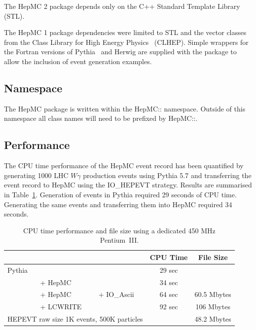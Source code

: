 \documentclass[11pt,letterpaper]{article}
\begin{document}
The HepMC 2 package  depends only on the C++ Standard
Template Library~\cite{stl} (STL).

The HepMC 1 package dependencies were limited to STL 
and the vector classes from the
Class Library for High Energy Physics~\cite{clhep} (CLHEP).  Simple
wrappers for the Fortran versions of Pythia~\cite{Sjostrand:2001yb} 
and Herwig are supplied with the
package to allow the inclusion of event generation examples.

\subsection{Namespace}

The HepMC package is written within the HepMC:: namespace. Outside of
this namespace all class names will need to be prefixed by HepMC::.

\subsection{Performance}

The CPU time performance of the HepMC event record has been quantified
by generating 1000 LHC $W\gamma$ production events using Pythia 5.7
and transferring the event record to HepMC using the IO\_HEPEVT
strategy. Results are summarised in Table~\ref{benchmarks}.
Generation of events in Pythia required 29 seconds of CPU time.
Generating the same events and transferring them into HepMC required
34 seconds.

\begin{table}[h]
\begin{center}
\begin{tabular}{|l l l|c|c|} \hline
&&&CPU Time & File Size \\ \hline
Pythia &           &          & 29 sec & \\
       & + {\color{red}HepMC}   &          & 34 sec & \\ \hline
       & + {\color{red}HepMC} & + {\color{red}IO\_Ascii} 
       & 64 sec & 60.5 Mbytes \\
       & + {\color{green}LCWRITE} &          
       & 92 sec & 106 Mbytes \\
\multicolumn{3}{|l|}{HEPEVT raw size 1K events, 500K particles}
&& 48.2 Mbytes \\ \hline
\end{tabular}
\end{center}
\caption{\label{benchmarks} 
  CPU time performance and file size using a dedicated 450 MHz Pentium~III.}
\end{table}
\end{document}
